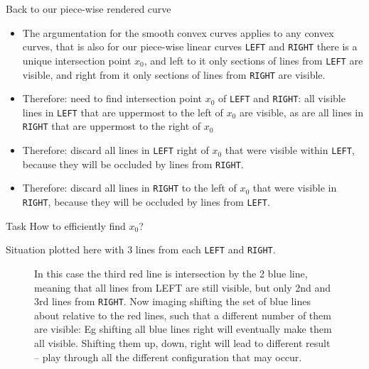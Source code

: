 \documentclass{article}
\begin{document}
\begin{frame}{Back to our piece-wise rendered curve}
  \begin{itemize}
  \item The argumentation for the smooth convex curves applies to any
    convex curves, that is also for our piece-wise linear curves
    \texttt{LEFT} and \texttt{RIGHT} there is a unique intersection
    point $x_0$, and left to it only sections of lines from \texttt{LEFT}
    are visible, and right from it only sections of lines from
    \texttt{RIGHT} are visible.
  \item Therefore: need to find intersection point $x_0$ of
    \texttt{LEFT} and \texttt{RIGHT}: all visible lines in
    \texttt{LEFT} that are uppermost to the left of $x_0$ are
    visible, as are all lines in \texttt{RIGHT} that are uppermost to
    the right of $x_0$
  \item Therefore: discard all lines in \texttt{LEFT} right of $x_0$ that were
    visible within \texttt{LEFT}, because they will be occluded by lines from \texttt{RIGHT}.
  \item Therefore: discard all lines in \texttt{RIGHT} to the left of
    $x_0$ that were visible in \texttt{RIGHT}, because they will be
    occluded by lines from \texttt{LEFT}.
  \end{itemize}
  
  \begin{block}{Task}
    How to efficiently find $x_0$?
  \end{block}
\end{frame}

\begin{frame}
  Situation plotted here with 3 lines from each \texttt{LEFT} and
  \texttt{RIGHT}.
  \begin{figure}
    \centering


\caption{In this case the third red line is intersection by the 2 blue line,
  meaning that all lines from LEFT are still visible, but only 2nd
  and 3rd lines from \texttt{RIGHT}. Now imaging shifting the set of
  blue lines about relative to the red lines, such that a different
  number of them are visible: Eg shifting all blue lines right will
  eventually make them all visible. Shifting them up, down, right will
  lead to different result -- play through all the different
  configuration that may occur.}
\end{figure}
\end{frame}
\end{document}
